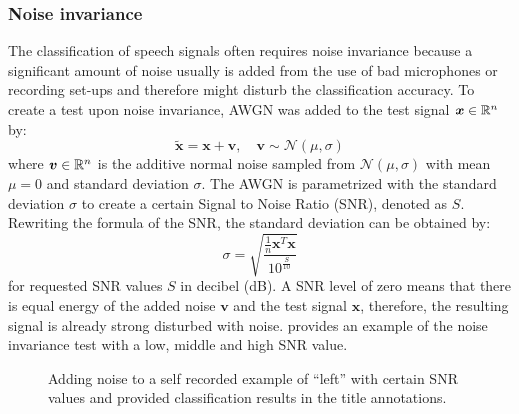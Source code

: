 \subsubsection{Noise invariance}
The classification of speech signals often requires noise invariance because a significant amount of noise usually is added from the use of bad microphones or recording set-ups and therefore might disturb the classification accuracy.
To create a test upon noise invariance, AWGN was added to the test signal $\bm{x} \in \mathbb{R}^n$ by:
\begin{equation}
  \bm{\tilde{x}} = \bm{x} + \bm{v}, \quad \bm{v} \sim \mathcal{N}(\mu, \sigma)
\end{equation}
where $\bm{v} \in \mathbb{R}^n$ is the additive normal noise sampled from $\mathcal{N}(\mu, \sigma)$ with mean $\mu = 0$ and standard deviation $\sigma$.
The AWGN is parametrized with the standard deviation $\sigma$ to create a certain Signal to Noise Ratio (SNR), denoted as $S$.
Rewriting the formula of the SNR, the standard deviation can be obtained by:
\begin{equation}
  \sigma = \sqrt{\frac{\frac{1}{n}\bm{x}^T \bm{x}}{10^{\frac{S}{10}}}}
\end{equation}
for requested SNR values $S$ in decibel (dB).
A SNR level of zero means that there is equal energy of the added noise $\bm{v}$ and the test signal $\bm{x}$, therefore, the resulting signal is already strong disturbed with noise.
 provides an example of the noise invariance test with a low, middle and high SNR value.
\begin{figure}[!ht]
  \centering
  \caption{Adding noise to a self recorded example of \enquote{left} with certain SNR values and provided classification results in the title annotations.}
  \label{fig:exp_details_tb_noise_left}
\end{figure}
